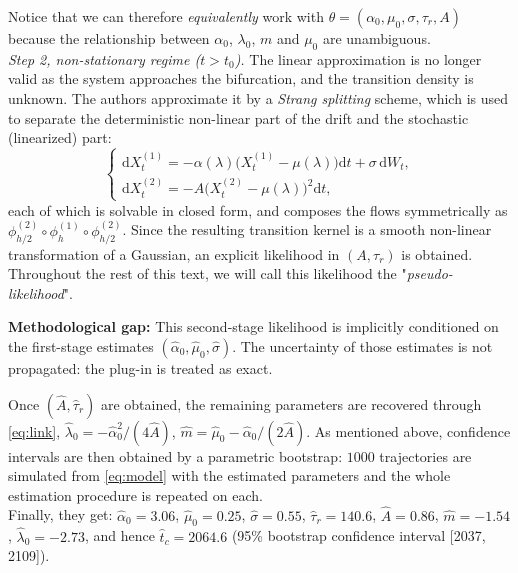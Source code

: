 \documentclass[12pt,a4paper]{article}
\theoremstyle{definition}
\theoremstyle{plain}
\newcommand{\dd}{\mathrm{d}}
\begin{document}
\noindent Notice that we can therefore \emph{equivalently} work with $\theta = (\alpha_0, \mu_0, \sigma, \tau_r, A)$ because the relationship between $\alpha_0$, $\lambda_0$, $m$ and $\mu_0$ are unambiguous. \\

\noindent \emph{Step 2, non-stationary regime ($t>t_0$).} The linear approximation is no longer valid as
the system approaches the bifurcation, and the transition density is unknown. The authors
approximate it by a \emph{Strang splitting} scheme, which is used to separate the deterministic non-linear part of the drift and the stochastic (linearized) part:
\[
\begin{cases}
\dd X^{(1)}_t=-\alpha(\lambda)\big(X^{(1)}_t-\mu(\lambda)\big)\dd t+\sigma\,\dd W_t,\\
\dd X^{(2)}_t=-A\big(X^{(2)}_t-\mu(\lambda)\big)^2\dd t,
\end{cases}
\]
each of which is solvable in closed form, and composes the flows symmetrically as
$\phi^{(2)}_{h/2}\circ\phi^{(1)}_{h}\circ\phi^{(2)}_{h/2}$. Since the resulting transition kernel is a smooth non-linear
transformation of a Gaussian, an explicit likelihood in $(A,\tau_r)$ is obtained. Throughout the rest of this text, we will call this likelihood the "\emph{pseudo-likelihood}". \\

\begin{tcolorbox}
\center \textbf{Methodological gap:} This second-stage likelihood is implicitly conditioned on the
first-stage estimates $(\hat\alpha_0,\hat\mu_0,\hat\sigma)$. The uncertainty of those
estimates is not propagated: the plug-in is treated as exact. \\
\end{tcolorbox}

\noindent Once $(\hat A,\hat\tau_r)$ are obtained, the remaining parameters are recovered through
\eqref{eq:link}, $\hat\lambda_0=-\hat\alpha_0^2/(4\hat A)$,
$\hat m=\hat\mu_0-\hat\alpha_0/(2\hat A)$. As mentioned above, confidence
intervals are then obtained by a parametric bootstrap: $1000$ trajectories are simulated from
\eqref{eq:model} with the estimated parameters and the whole estimation procedure is repeated
on each. \\

\noindent Finally, they get: 
$\hat\alpha_0=3.06$, $\hat\mu_0=0.25$, $\hat\sigma=0.55$, $\hat\tau_r=140.6$, $\hat A=0.86$,
$\hat m=-1.54$, $\hat\lambda_0=-2.73$, and hence $\hat t_c = 2064.6$ (95\% bootstrap confidence interval [2037,\,2109]). \\
\end{document}
